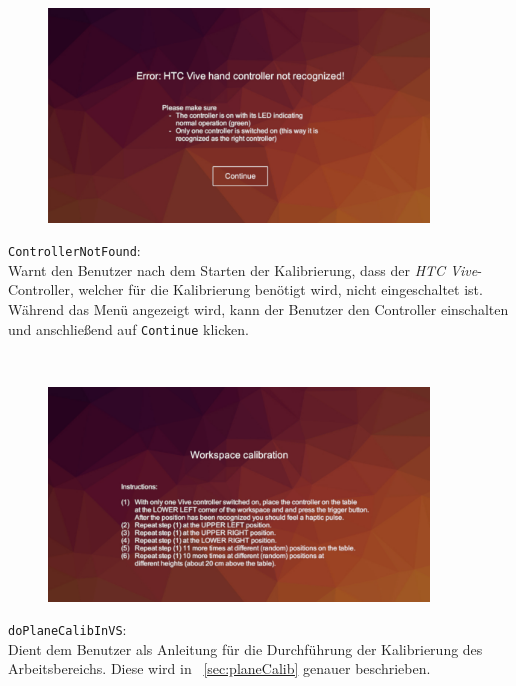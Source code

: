 \begin{minipage}{0.6\textwidth}
	\begin{figure}[H] 
		\includegraphics[trim=3cm 1cm 3cm 3cm, clip, width=0.9\textwidth]{Bilder/ControllerNotFound.jpg}
			\label{fig:ControllerNotFound}
	\end{figure}
\end{minipage}
\begin{minipage}{0.4\textwidth}
	\texttt{ControllerNotFound}:\\
	Warnt den Benutzer nach dem Starten der Kalibrierung, dass der \textit{HTC Vive}-Controller, welcher für die Kalibrierung benötigt wird, nicht eingeschaltet ist. Während das Menü angezeigt wird, kann der Benutzer den Controller einschalten und anschließend auf \texttt{Continue} klicken.
\end{minipage}\\

\begin{minipage}{0.6\textwidth}
	\begin{figure}[H] 
		\includegraphics[trim=3cm 1cm 3cm 3cm, clip, width=0.9\textwidth]{Bilder/doPlaneCalibInVS.jpg}
			\label{fig:doPlaneCalibInVS}
	\end{figure}
\end{minipage}
\begin{minipage}{0.4\textwidth}
	\texttt{doPlaneCalibInVS}:\\
	Dient dem Benutzer als Anleitung für die Durchführung der Kalibrierung des Arbeitsbereichs. Diese wird in ~\ref{sec:planeCalib} genauer beschrieben.
\end{minipage}\\

